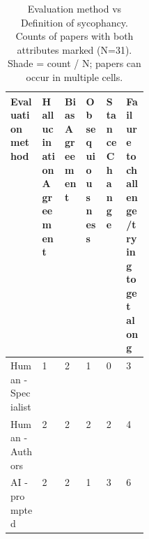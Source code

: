 \begin{table}[!htbp]
\centering
\small
\setlength{\tabcolsep}{4pt}
\renewcommand{\arraystretch}{1.3}
\caption{Evaluation method vs Definition of sycophancy. Counts of papers with both attributes marked (N=31). Shade = count / N; papers can occur in multiple cells.}
\begin{tabularx}{\linewidth}{|>{\raggedright\arraybackslash}p{0.23\linewidth}|>{\centering\arraybackslash}X|>{\centering\arraybackslash}X|>{\centering\arraybackslash}X|>{\centering\arraybackslash}X|>{\centering\arraybackslash}X|}
\hline
\textbf{Evaluation method} & \textbf{\hspace{0pt}Hallucination Agreement} & \textbf{\hspace{0pt}Bias Agreement} & \textbf{\hspace{0pt}Obsequiousness} & \textbf{\hspace{0pt}Stance Change} & \textbf{\hspace{0pt}Failure to challenge/trying to get along} \\ \hline
Human - Specialist & \cellcolor{purple!3}1 & \cellcolor{purple!6}2 & \cellcolor{purple!3}1 & \cellcolor{purple!0}0 & \cellcolor{purple!10}3 \\ \hline
Human - Authors & \cellcolor{purple!6}2 & \cellcolor{purple!6}2 & \cellcolor{purple!6}2 & \cellcolor{purple!6}2 & \cellcolor{purple!13}4 \\ \hline
AI - prompted & \cellcolor{purple!6}2 & \cellcolor{purple!6}2 & \cellcolor{purple!3}1 & \cellcolor{purple!10}3 & \cellcolor{purple!19}6 \\ \hline
\end{tabularx}
\end{table}
